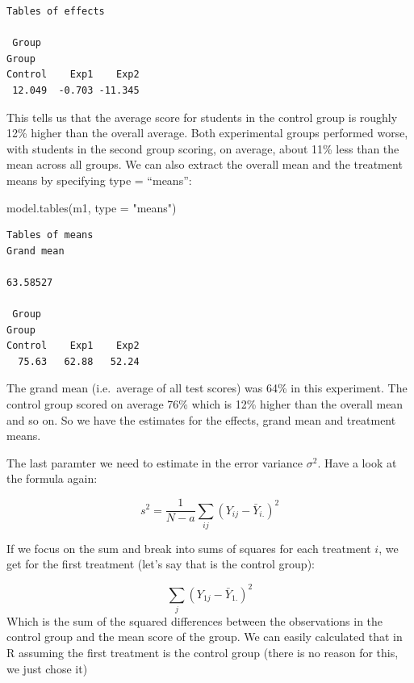 \documentclass[
  letterpaper,
  DIV=11,
  numbers=noendperiod,
  oneside]{scrreprt}
\newenvironment{Shaded}{\begin{snugshade}}{\end{snugshade}}
\newcommand{\AttributeTok}[1]{\textcolor[rgb]{0.40,0.45,0.13}{#1}}
\newcommand{\FunctionTok}[1]{\textcolor[rgb]{0.28,0.35,0.67}{#1}}
\newcommand{\NormalTok}[1]{\textcolor[rgb]{0.00,0.23,0.31}{#1}}
\newcommand{\StringTok}[1]{\textcolor[rgb]{0.13,0.47,0.30}{#1}}
\begin{document}
\begin{verbatim}
Tables of effects

 Group 
Group
Control    Exp1    Exp2 
 12.049  -0.703 -11.345 
\end{verbatim}

This tells us that the average score for students in the control group
is roughly 12\% higher than the overall average. Both experimental groups performed worse, with
students in the second group scoring, on average, about 11\% less than
the mean across all groups. We can also extract the overall mean and the
treatment means by specifying type = ``means'':

\begin{Shaded}
\begin{Highlighting}[]
\FunctionTok{model.tables}\NormalTok{(m1, }\AttributeTok{type =} \StringTok{"means"}\NormalTok{)}
\end{Highlighting}
\end{Shaded}

\begin{verbatim}
Tables of means
Grand mean
         
63.58527 

 Group 
Group
Control    Exp1    Exp2 
  75.63   62.88   52.24 
\end{verbatim}

The grand mean (i.e.~average of all test scores) was 64\% in this
experiment. The control group scored on average 76\% which is 12\%
higher than the overall mean and so on. So we have the estimates for the
effects, grand mean and treatment means.

The last paramter we need to estimate in the error variance
\(\sigma^2\). Have a look at the formula again:

\[ s^2 = \frac{1}{N-a}\sum_{ij}(Y_{ij} - \bar{Y}_{i.})^2 \]

If we focus on the sum and break into sums of squares for each treatment
\(i\), we get for the first treatment (let's say that is the control
group):

\[ \sum_{j}(Y_{1j} - \bar{Y}_{1.})^2 \] Which is the sum of the squared
differences between the observations in the control group and the mean
score of the group. We can easily calculated that in R assuming the
first treatment is the control group (there is no reason for this, we
just chose it)
\end{document}
